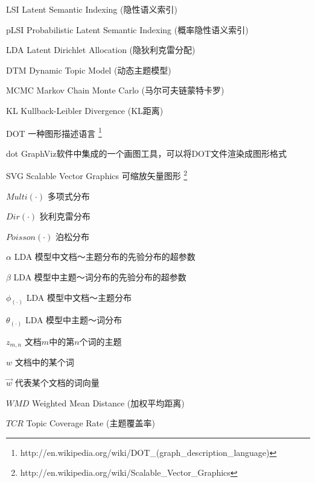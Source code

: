 \begin{denotation}
\item[LSI]  Latent Semantic Indexing
            \cite{deerwester1990indexing} (隐性语义索引)
\item[pLSI] Probabilistic Latent Semantic Indexing
            \cite{hofmann1999probabilistic} (概率隐性语义索引)
\item[LDA]  Latent Dirichlet Allocation\cite{Blei:2003} (隐狄利克雷分配)
\item[DTM]  Dynamic Topic Model\cite{Blei:2006} (动态主题模型)
\item[MCMC] Markov Chain Monte Carlo (马尔可夫链蒙特卡罗)
\item[KL]   Kullback-Leibler Divergence (KL距离)
\item[DOT]  一种图形描述语言
            \footnote{http://en.wikipedia.org/wiki/DOT\_(graph\_description\_language)}
\item[dot]  GraphViz软件中集成的一个画图工具，可以将DOT文件渲染成图形格式
\item[SVG]  Scalable Vector Graphics 可缩放矢量图形
            \footnote{http://en.wikipedia.org/wiki/Scalable\_Vector\_Graphics}

\item[$Multi(\cdot)$]     多项式分布
\item[$Dir(\cdot)$]       狄利克雷分布
\item[$Poisson(\cdot)$]   泊松分布
\item[$\alpha$]           LDA 模型中文档～主题分布的先验分布的超参数
\item[$\beta$]            LDA 模型中主题～词分布的先验分布的超参数
\item[$\phi_{(\cdot)}$]   LDA 模型中文档～主题分布
\item[$\theta_{(\cdot)}$] LDA 模型中主题～词分布
\item[$z_{m,n}$]          文档$m$中的第$n$个词的主题
\item[$w$]                文档中的某个词
\item[$\vec{w}$]          代表某个文档的词向量
\item[$WMD$]              Weighted Mean Distance (加权平均距离)
\item[$TCR$]              Topic Coverage Rate (主题覆盖率)
\end{denotation}